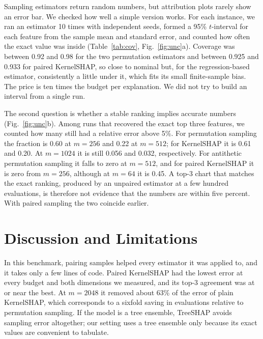 \documentclass[conference]{IEEEtran}
\begin{document}
Sampling estimators return random numbers, but attribution plots rarely show an error bar. We checked how well a simple version works. For each instance, we ran an estimator 10 times with independent seeds, formed a 95\% $t$-interval for each feature from the sample mean and standard error, and counted how often the exact value was inside (Table~\ref{tab:cov}, Fig.~\ref{fig:unc}a). Coverage was between 0.92 and 0.98 for the two permutation estimators and between 0.925 and 0.933 for paired KernelSHAP, so close to nominal but, for the regression-based estimator, consistently a little under it, which fits its small finite-sample bias. The price is ten times the budget per explanation. We did not try to build an interval from a single run.

The second question is whether a stable ranking implies accurate numbers (Fig.~\ref{fig:unc}b). Among runs that recovered the exact top three features, we counted how many still had a relative error above 5\%. For permutation sampling the fraction is 0.60 at $m=256$ and 0.22 at $m=512$; for KernelSHAP it is 0.61 and 0.20. At $m=1024$ it is still 0.056 and 0.032, respectively. For antithetic permutation sampling it falls to zero at $m=512$, and for paired KernelSHAP it is zero from $m=256$, although at $m=64$ it is 0.45. A top-3 chart that matches the exact ranking, produced by an unpaired estimator at a few hundred evaluations, is therefore not evidence that the numbers are within five percent. With paired sampling the two coincide earlier.

\section{Discussion and Limitations}
In this benchmark, pairing samples helped every estimator it was applied to, and it takes only a few lines of code. Paired KernelSHAP had the lowest error at every budget and both dimensions we measured, and its top-3 agreement was at or near the best. At $m=2048$ it removed about 63\% of the error of plain KernelSHAP, which corresponds to a sixfold saving in evaluations relative to permutation sampling. If the model is a tree ensemble, TreeSHAP \cite{lundberg2020trees} avoids sampling error altogether; our setting uses a tree ensemble only because its exact values are convenient to tabulate.
\end{document}
